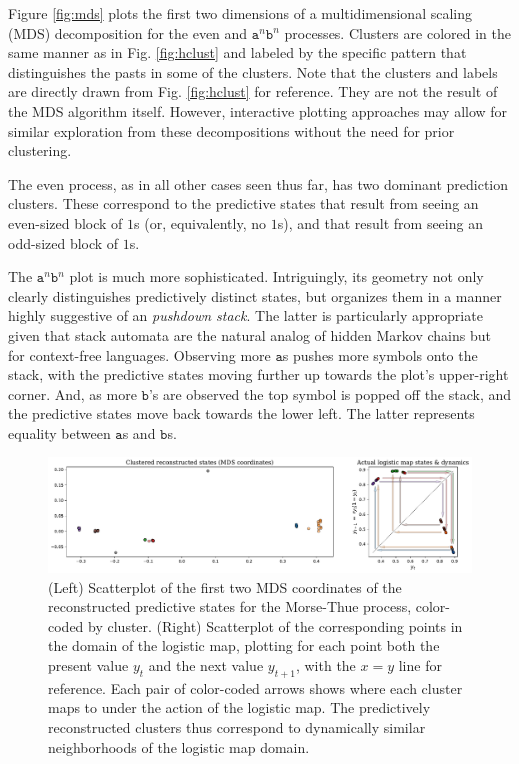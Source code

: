 \documentclass[draft,aps,pre,twocolumn,groupaddress,showkeys,nofootinbib,preprintnumbers,floatfix]{revtex4-2}
\begin{document}
Figure \ref{fig:mds} plots the first two dimensions of a multidimensional
scaling (MDS) decomposition \cite{Borg05a} for the even and
$\mathtt{a}^n\mathtt{b}^n$ processes. Clusters are colored in the same manner
as in Fig. \ref{fig:hclust} and labeled by the specific pattern that
distinguishes the pasts in some of the clusters. Note that the clusters and
labels are directly drawn from Fig. \ref{fig:hclust} for reference. They are
not the result of the MDS algorithm itself. However, interactive plotting
approaches may allow for similar exploration from these decompositions without
the need for prior clustering.

The even process, as in all other cases seen thus far, has two dominant
prediction clusters. These correspond to the predictive states that result
from seeing an even-sized block of $1$s (or, equivalently, no $1$s), and that
result from seeing an odd-sized block of $1$s.

The $\mathtt{a}^n\mathtt{b}^n$ plot is much more sophisticated. Intriguingly,
its geometry not only clearly distinguishes predictively distinct states, but
organizes them in a manner highly suggestive of an \emph{pushdown stack}. The
latter is particularly appropriate given that stack automata are the natural
analog of hidden Markov chains but for context-free languages. Observing more
$\mathtt{a}$s pushes more symbols onto the stack, with the predictive states
moving further up towards the plot's upper-right corner. And, as more
$\mathtt{b}$'s are observed the top symbol is popped off the stack, and the
predictive states move back towards the lower left. The latter represents
equality between $\mathtt{a}$s and $\mathtt{b}$s.

\begin{figure}[ht]
\centering
\includegraphics[width=\linewidth]{../plots/feig_MDS.pdf}
\caption{(Left) Scatterplot of the first two MDS coordinates of the
	reconstructed predictive states for the Morse-Thue process, color-coded by
	cluster. (Right) Scatterplot of the corresponding points in the domain of
	the logistic map, plotting for each point both the present value $y_t$ and
	the next value $y_{t+1}$, with the $x=y$ line for reference. Each pair of
	color-coded arrows shows where each cluster maps to under the action of the
	logistic map. The predictively reconstructed clusters thus correspond to
	dynamically similar neighborhoods of the logistic map domain.
	}
\label{fig:mds-feig}
\end{figure}
\end{document}
